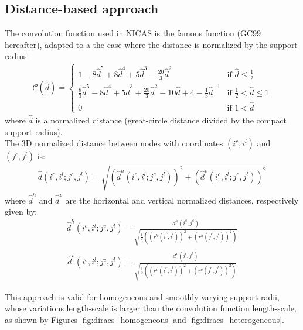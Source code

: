 \documentclass[12pt]{scrartcl}
\begin{document}
\subsection{Distance-based approach}
The convolution function used in NICAS is the famous \citet{gaspari_1999} function (GC99 hereafter), adapted to a the case where the distance is normalized by the support radius:
\begin{align}
\mathcal{C}(\widehat{d}) = \left\{
\begin{array}{ll}
\displaystyle
1 - 8 \widehat{d}^5 + 8 \widehat{d}^4 + 5 \widehat{d}^3 - \frac{20}{3} \widehat{d}^2 & \displaystyle \text{if }\widehat{d} \le \frac{1}{2} \\[2ex]
\displaystyle
\frac{8}{3} \widehat{d}^5 - 8 \widehat{d}^4 + 5 \widehat{d}^3 + \frac{20}{3} \widehat{d}^2 - 10 \widehat{d} + 4 - \frac{1}{3} \widehat{d}^{-1} & \displaystyle \text{if }\frac{1}{2} < \widehat{d} \le 1 \\[2ex]
\displaystyle
0 & \text{if } 1 < \widehat{d}
\end{array} \right.
\end{align}                 
where $\widehat{d}$ is a normalized distance (great-circle distance divided by the compact support radius).\\
$  $\\
The 3D normalized distance between nodes with coordinates $(i^c,i^l)$ and $(j^c,j^l)$ is:
\begin{align}
\widehat{d}(i^c,i^l;j^c,j^l) = \sqrt{\left(\widehat{d}^h(i^c,i^l;j^c,j^l)\right)^2+\left(\widehat{d}^v(i^c,i^l;j^c,j^l)\right)^2}
\end{align}
where $\widehat{d}^h$ and $\widehat{d}^v$ are the horizontal and vertical normalized distances, respectively given by:
\begin{align}
\widehat{d}^h(i^c,i^l;j^c,j^l) = \frac{d^h(i^c,j^c)}{\displaystyle \sqrt{\frac{1}{2}\left(\left(r^h(i^c,i^l)\right)^2+\left(r^h(j^c,j^l)\right)^2\right)}}
\end{align}
\begin{align}
\widehat{d}^v(i^c,i^l;j^c,j^l) = \frac{d^v(i^l,j^l)}{\displaystyle \sqrt{\frac{1}{2}\left(\left(r^v(i^c,i^l)\right)^2+\left(r^v(j^c,j^l)\right)^2\right)}}
\end{align}

This approach is valid for homogeneous and smoothly varying support radii, whose variations length-scale is larger than the convolution function length-scale, as shown by Figures \ref{fig:diracs_homogeneous} and \ref{fig:diracs_heterogeneous}.
\end{document}
